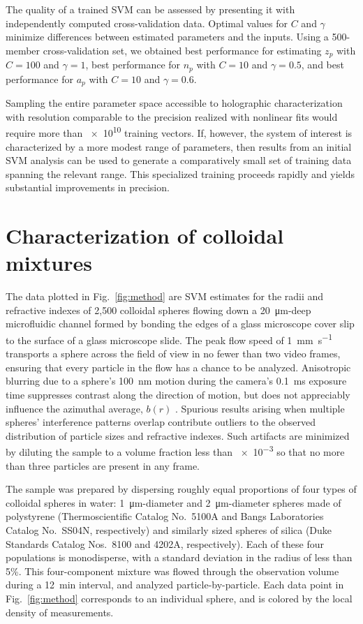 The quality of a trained SVM can be assessed by presenting
it with independently computed cross-validation data.
Optimal values for $C$ and $\gamma$ minimize differences
between estimated parameters and the inputs.
Using a 500-member cross-validation set, we obtained
best performance for estimating $z_p$
with $C = 100$ and $\gamma = 1$, best performance
for $n_p$ with $C = 10$ and $\gamma = 0.5$, and
best performance for $a_p$ with $C = 10$ and $\gamma = 0.6$.

Sampling the entire parameter space accessible to
holographic characterization with resolution
comparable to the precision realized with nonlinear fits
\cite{lee07a}
would require more than \num{e10} training vectors.
If, however, the system of interest is characterized by a more modest range
of parameters, then results from an initial SVM analysis
can be used to generate a comparatively small set of training data
spanning the relevant range.
This specialized training proceeds rapidly
and yields substantial improvements in precision.

\section{Characterization of colloidal mixtures}

The data plotted in Fig.~\ref{fig:method} are
SVM estimates for the radii and refractive indexes of 2,500 
colloidal spheres flowing down a \SI{20}{\um}-deep 
microfluidic channel formed by bonding
the edges of a glass microscope cover slip to the surface of a
glass microscope slide.
The peak flow speed of 
\SI{1}{\mm\per\second} transports  
a sphere across the field of view in no fewer than  
two video frames, ensuring that every particle in the  
flow has a chance to be analyzed.  
Anisotropic blurring due to a sphere's \SI{100}{\nm} 
motion during the camera's \SI{0.1}{\ms} exposure time  
suppresses contrast along the direction of motion, but does not  
appreciably influence the azimuthal average, $b(r)$ \cite{dixon11}.  
Spurious results arising when 
multiple spheres' interference patterns overlap
contribute outliers to the observed
distribution of particle sizes and refractive indexes.
Such artifacts are minimized by diluting the sample to a volume
fraction less than \num{e-3} so that 
no more than three particles are present in any frame.

The sample was prepared by dispersing roughly equal proportions 
of four types of colloidal spheres in water:
\SI{1}{\um}-diameter and \SI{2}{\um}-diameter 
spheres made of polystyrene (Thermoscientific Catalog No.\ 5100A and 
Bangs Laboratories Catalog No.\ SS04N, respectively) and similarly
sized spheres of silica (Duke
Standards Catalog Nos.\ 8100 and 4202A, respectively).
Each of these four populations is monodisperse, with a
standard deviation in the radius of less than 5\%.
This four-component mixture was 
flowed through the
observation volume during a \SI{12}{\minute} interval,
and analyzed particle-by-particle.
Each data point in Fig.~\ref{fig:method} corresponds to an individual 
sphere, and is colored by the local density of measurements.

